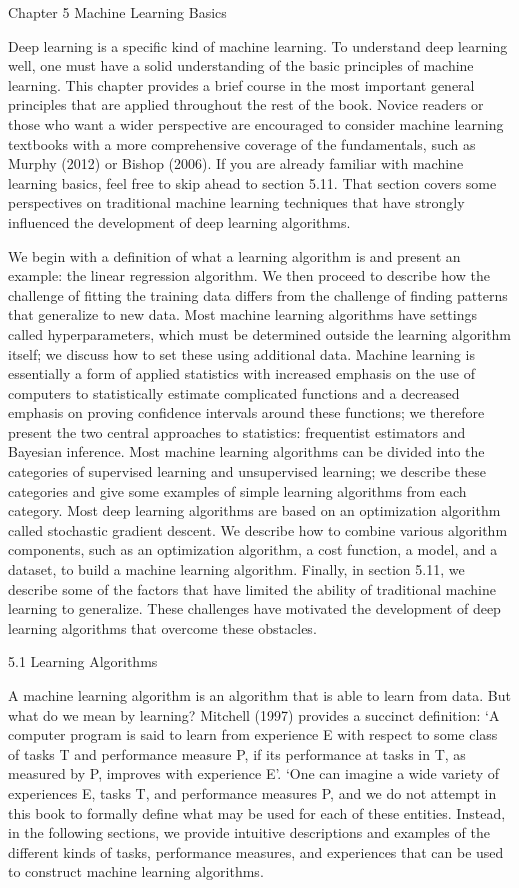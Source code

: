 \documentclass[11pt]{article}
\begin{document}
Chapter 5
Machine Learning Basics

Deep learning is a speciﬁc kind of machine learning.
To understand deep learning well, one must have a solid understanding of the basic principles of machine learning.
This chapter provides a brief course in the most important general principles that are applied throughout the rest of the book.
Novice readers or those who want a wider perspective are encouraged to consider machine learning textbooks with a more comprehensive coverage of the fundamentals, such as Murphy (2012) or Bishop (2006).
If you are already familiar with machine learning basics, feel free to skip ahead to section 5.11.
That section covers some perspectives on traditional machine learning techniques that have strongly influenced the development of deep learning algorithms.

We begin with a deﬁnition of what a learning algorithm is and present an
example: the linear regression algorithm. We then proceed to describe how the
challenge of ﬁtting the training data diﬀers from the challenge of ﬁnding patterns
that generalize to new data. Most machine learning algorithms have settings
called hyperparameters, which must be determined outside the learning algorithm
itself; we discuss how to set these using additional data. Machine learning is
essentially a form of applied statistics with increased emphasis on the use of
computers to statistically estimate complicated functions and a decreased emphasis
on proving conﬁdence intervals around these functions; we therefore present the
two central approaches to statistics: frequentist estimators and Bayesian inference.
Most machine learning algorithms can be divided into the categories of supervised
learning and unsupervised learning; we describe these categories and give some
examples of simple learning algorithms from each category. Most deep learning
algorithms are based on an optimization algorithm called stochastic gradient
descent. We describe how to combine various algorithm components, such as
an optimization algorithm, a cost function, a model, and a dataset, to build a
machine learning algorithm. Finally, in section 5.11, we describe some of the
factors that have limited the ability of traditional machine learning to generalize.
These challenges have motivated the development of deep learning algorithms that
overcome these obstacles.

5.1 Learning Algorithms

A machine learning algorithm is an algorithm that is able to learn from data.
But what do we mean by learning? Mitchell (1997) provides a succinct definition:
`A computer program is said to learn from experience E with respect to some class of tasks T and performance measure P, if its performance at tasks in T, as measured by P, improves with experience E'.
`One can imagine a wide variety of experiences E, tasks T, and performance measures P, and we do not attempt in this book to formally define what may be used for each of these entities.
Instead, in the following sections, we provide intuitive descriptions and examples of the different kinds of tasks, performance measures, and experiences that can be used to construct machine learning algorithms.
\end{document}
